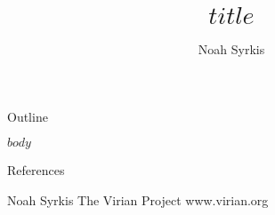 \documentclass[aspectratio=32]{beamer}
\title{$title$}
\author{Noah Syrkis}
\date{\mydate{\today}}
\begin{document}
\begin{frame}
  \titlepage
\end{frame}

\begin{frame}{Outline}
   \tableofcontents
\end{frame}

$body$

\begin{frame}[allowframebreaks]{References}
  \begingroup
  \linespread{1.2}
  \scriptsize
  \printbibliography
  \endgroup
\end{frame}

\begin{frame}
  \begin{center}
    \vfill
    \large Noah Syrkis
    \vfill
    \large The Virian Project
    \vfill
    \large www.virian.org
    \vfill
  \end{center}
\end{frame}
\end{document}
